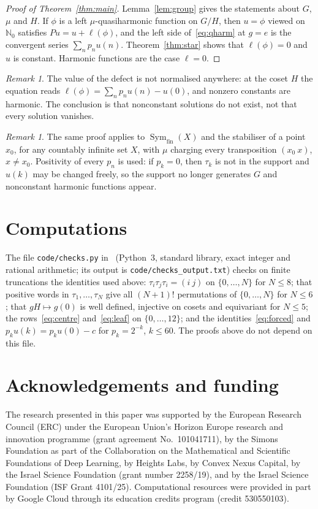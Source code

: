 \documentclass[11pt]{amsart}
\theoremstyle{definition}
\theoremstyle{remark}
\newtheorem{remark}[theorem]{Remark}
\newcommand{\N}{\mathbb N}
\DeclareMathOperator{\Sym}{Sym}
\begin{document}
\begin{proof}[Proof of Theorem~\ref{thm:main}]
Lemma~\ref{lem:group} gives the statements about $G$, $\mu$ and $H$. If $\phi$ is a left $\mu$-quasiharmonic function on $G/H$, then $u=\phi$ viewed on $\N_0$ satisfies $Pu=u+\ell(\phi)$, and the left side of~\eqref{eq:qharm} at $g=e$ is the convergent series $\sum_np_nu(n)$. Theorem~\ref{thm:star} shows that $\ell(\phi)=0$ and $u$ is constant. Harmonic functions are the case $\ell=0$.
\end{proof}

\begin{remark}
The value of the defect is not normalised anywhere: at the coset $H$ the equation reads $\ell(\phi)=\sum_np_nu(n)-u(0)$, and nonzero constants are harmonic. The conclusion is that nonconstant solutions do not exist, not that every solution vanishes.
\end{remark}

\begin{remark}
The same proof applies to $\Sym_{\mathrm{fin}}(X)$ and the stabiliser of a point $x_0$, for any countably infinite set $X$, with $\mu$ charging every transposition $(x_0\ x)$, $x\ne x_0$. Positivity of every $p_n$ is used: if $p_k=0$, then $\tau_k$ is not in the support and $u(k)$ may be changed freely, so the support no longer generates $G$ and nonconstant harmonic functions appear.
\end{remark}

\section*{Computations}
The file \texttt{code/checks.py} in~\cite{code} (Python~3, standard library, exact integer and rational arithmetic; its output is \texttt{code/checks\_output.txt}) checks on finite truncations the identities used above: $\tau_i\tau_j\tau_i=(i\ j)$ on $\{0,\dots,N\}$ for $N\le8$; that positive words in $\tau_1,\dots,\tau_N$ give all $(N+1)!$ permutations of $\{0,\dots,N\}$ for $N\le6$; that $gH\mapsto g(0)$ is well defined, injective on cosets and equivariant for $N\le5$; the rows~\eqref{eq:centre} and~\eqref{eq:leaf} on $\{0,\dots,12\}$; and the identities~\eqref{eq:forced} and $p_ku(k)=p_ku(0)-c$ for $p_k=2^{-k}$, $k\le60$. The proofs above do not depend on this file.

\section*{Acknowledgements and funding}
The research presented in this paper was supported by the European Research
Council (ERC) under the European Union's Horizon Europe research and
innovation programme (grant agreement No.~101041711), by the Simons
Foundation as part of the Collaboration on the Mathematical and Scientific
Foundations of Deep Learning, by Heights Labs, by Convex Nexus Capital, by
the Israel Science Foundation (grant number 2258/19), and by the Israel
Science Foundation (ISF Grant 4101/25). Computational resources were
provided in part by Google Cloud through its education credits program
(credit 530550103).
\end{document}
